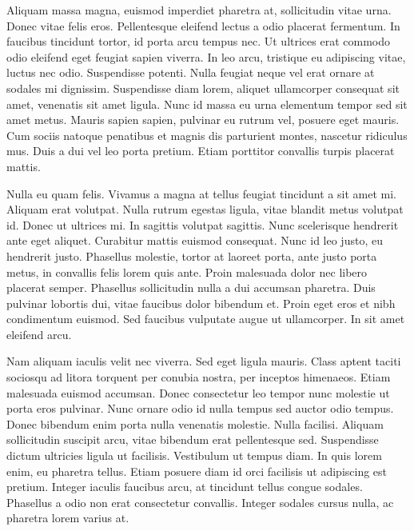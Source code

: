 Aliquam massa magna, euismod imperdiet pharetra at, sollicitudin vitae urna.
Donec vitae felis eros.
Pellentesque eleifend lectus a odio placerat fermentum.
In faucibus tincidunt tortor, id porta arcu tempus nec.
Ut ultrices erat commodo odio eleifend eget feugiat sapien viverra.
In leo arcu, tristique eu adipiscing vitae, luctus nec odio.
Suspendisse potenti.
Nulla feugiat neque vel erat ornare at sodales mi dignissim.
Suspendisse diam lorem, aliquet ullamcorper consequat sit amet, venenatis sit amet ligula.
Nunc id massa eu urna elementum tempor sed sit amet metus.
Mauris sapien sapien, pulvinar eu rutrum vel, posuere eget mauris.
Cum sociis natoque penatibus et magnis dis parturient montes, nascetur ridiculus mus.
Duis a dui vel leo porta pretium.
Etiam porttitor convallis turpis placerat mattis.

Nulla eu quam felis.
Vivamus a magna at tellus feugiat tincidunt a sit amet mi.
Aliquam erat volutpat.
Nulla rutrum egestas ligula, vitae blandit metus volutpat id.
Donec ut ultrices mi.
In sagittis volutpat sagittis.
Nunc scelerisque hendrerit ante eget aliquet.
Curabitur mattis euismod consequat.
Nunc id leo justo, eu hendrerit justo.
Phasellus molestie, tortor at laoreet porta, ante justo porta metus, in convallis felis lorem quis ante.
Proin malesuada dolor nec libero placerat semper.
Phasellus sollicitudin nulla a dui accumsan pharetra.
Duis pulvinar lobortis dui, vitae faucibus dolor bibendum et.
Proin eget eros et nibh condimentum euismod.
Sed faucibus vulputate augue ut ullamcorper.
In sit amet eleifend arcu.

Nam aliquam iaculis velit nec viverra.
Sed eget ligula mauris.
Class aptent taciti sociosqu ad litora torquent per conubia nostra, per inceptos himenaeos.
Etiam malesuada euismod accumsan.
Donec consectetur leo tempor nunc molestie ut porta eros pulvinar.
Nunc ornare odio id nulla tempus sed auctor odio tempus.
Donec bibendum enim porta nulla venenatis molestie.
Nulla facilisi.
Aliquam sollicitudin suscipit arcu, vitae bibendum erat pellentesque sed.
Suspendisse dictum ultricies ligula ut facilisis.
Vestibulum ut tempus diam.
In quis lorem enim, eu pharetra tellus.
Etiam posuere diam id orci facilisis ut adipiscing est pretium.
Integer iaculis faucibus arcu, at tincidunt tellus congue sodales.
Phasellus a odio non erat consectetur convallis.
Integer sodales cursus nulla, ac pharetra lorem varius at.

